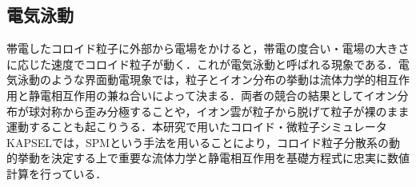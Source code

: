 \subsection{電気泳動}
\par 帯電したコロイド粒子に外部から電場をかけると，帯電の度合い・電場の大きさに応じた速度でコロイド粒子が動く．これが電気泳動と呼ばれる現象である．電気泳動のような界面動電現象では，粒子とイオン分布の挙動は流体力学的相互作用と静電相互作用の兼ね合いによって決まる．両者の競合の結果としてイオン分布が球対称から歪み分極することや，イオン雲が粒子から脱げて粒子が裸のまま運動することも起こりうる．本研究で用いたコロイド・微粒子シミュレータKAPSELでは，SPMという手法を用いることにより，コロイド粒子分散系の動的挙動を決定する上で重要な流体力学と静電相互作用を基礎方程式に忠実に数値計算を行っている．
